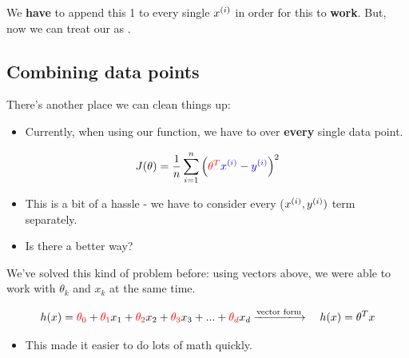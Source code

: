         We \textbf{have} to append this 1 to every single $x^{(i)}$ in order for this to \textbf{work}. But, now we can treat our  as .



    \pagebreak
    
    \subsection{Combining data points}

        There's another place we can clean things up:

        \begin{itemize}
            \item Currently, when using our  function, we have to  over \textbf{every} single data point.
        \end{itemize}
    
        \begin{equation}
            J(\theta) = 
            \frac{1}{n}  \sum_{i=1}^n 
            \Big( \textcolor{red}{\theta^T} \textcolor{blue}{x^{(i)}}  - \textcolor{blue}{y^{(i)}}   \Big)^2
        \end{equation}

        \begin{itemize}
            \item This is a bit of a hassle - we have to consider every ($x^{(i)}, y^{(i)})$ term separately.

            \item Is there a better way?
        \end{itemize}
        
        We've solved this kind of problem before: using vectors above, we were able to work with  $\theta_k$ and  $x_k$ at the same time.

            \begin{equation*}
            h(x) = \red{\theta_0} + \red{\theta_1}x_1 + \red{\theta_2}x_2 + \red{\theta_3}x_3 + ... + \red{\theta_d}x_d
            \xlongrightarrow{\text{vector form}} \quad
            h(x) = \theta^Tx
        \end{equation*}
        
        \begin{itemize}
            \item This made it easier to do lots of math quickly.\\
        \end{itemize}

